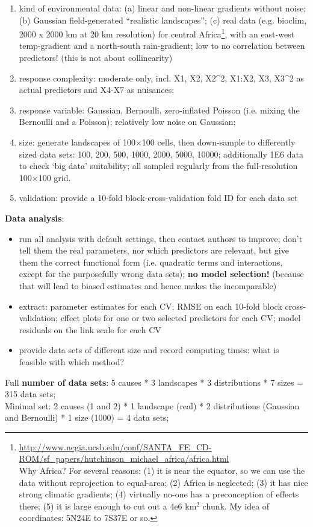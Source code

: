 \documentclass[11pt]{article}
\begin{document}
\begin{enumerate}
\item kind of environmental data: (a) linear and non-linear gradients without noise; (b) Gaussian field-generated ``realistic landscapes''; (c) real data (e.g. bioclim, 2000 x 2000 km at 20 km resolution) for central Africa\footnote{\url{http://www.ncgia.ucsb.edu/conf/SANTA_FE_CD-ROM/sf_papers/hutchinson_michael_africa/africa.html}\\Why Africa? For several reasons: (1) it is near the equator, so we can use the data without reprojection to equal-area; (2) Africa is neglected; (3) it has nice strong climatic gradients; (4) virtually no-one has a preconception of effects there; (5) it is large enough to cut out a 4e6 km$^2$ chunk. My idea of coordinates: 5N24E to 7S37E or so.}, with an east-west temp-gradient and a north-south rain-gradient; low to no correlation between predictors! (this is not about collinearity)
\item response complexity: moderate only, incl. X1, X2, X2\^{}2, X1:X2, X3, X3\^{}2 as actual predictors and X4-X7 as nuisances;
\item response variable: Gaussian, Bernoulli, zero-inflated Poisson (i.e. mixing the Bernoulli and a Poisson); relatively low noise on Gaussian;
\item size: generate landscapes of 100$\times$100 cells, then down-sample to differently sized data sets: 100, 200, 500, 1000, 2000, 5000, 10000; additionally 1E6 data to check `big data' suitability; all sampled regularly from the full-resolution 100$\times$100 grid.
\item validation: provide a 10-fold block-cross-validation fold ID for each data set
\end{enumerate}
%
\textbf{Data analysis}:
\begin{itemize}
\item run all analysis with default settings, then contact authors to improve; don't tell them the real parameters, nor which predictors are relevant, but give them the correct functional form (i.e. quadratic terms and interactions, except for the purposefully wrong data sets); \textbf{no model selection!} (because that will lead to biased estimates and hence makes the incomparable)
\item extract: parameter estimates for each CV; RMSE on each 10-fold block cross-validation; effect plots for one or two selected predictors for each CV; model residuals on the link scale for each CV
\item provide data sets of different size and record computing times: what is feasible with which method?
\end{itemize}
%
Full \textbf{number of data sets}: 5 causes * 3 landscapes * 3 distributions * 7 sizes = 315 data sets; \\
Minimal set: 2 causes (1 and 2) * 1 landscape (real) * 2 distributions (Gaussian and Bernoulli) * 1 size (1000) = 4 data sets;





\end{document}
